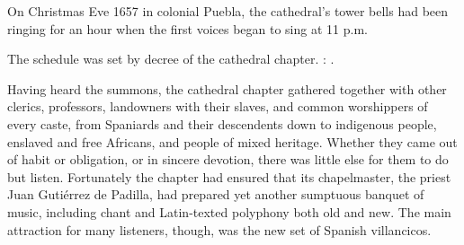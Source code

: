 On Christmas Eve 1657 in colonial Puebla, the cathedral's tower bells had been
ringing for an hour when the first voices began to sing at 11 p.m.%
\begin{Footnote}
    \label{fn:Puebla-Matins-time}
    The schedule was set by decree of the cathedral chapter.
    :
    .
\end{Footnote}
Having heard the summons, the cathedral chapter gathered together with other
clerics, professors, landowners with their slaves, and common worshippers of
every caste, from Spaniards and their descendents down to indigenous people,
enslaved and free Africans, and people of mixed heritage.%
    \Autocites
    {AngelContreras:Puebla}
    {Lomeli:Puebla}
    {Sierra:UrbanSlavery}
Whether they came out of habit or obligation, or in sincere devotion, there was
little else for them to do but listen.
Fortunately the chapter had ensured that its chapelmaster, the priest Juan
Gutiérrez de Padilla, had prepared yet another sumptuous banquet of music,
including chant and Latin-texted polyphony both old and new.%
    \Autocites
    {Gembero:Padilla}
    {Hurtado:Padilla}
    {Stevenson:Padilla}
    {Miranda:PadillaLuz}
    {Gali:RitualesSonorosPuebla}
    {Swadley:VillancicoPhD}
The main attraction for many listeners, though, was the new set of Spanish
villancicos.

